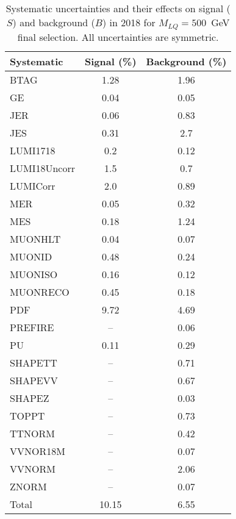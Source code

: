 \begin{table}[htbp]
\begin{center}
\caption{Systematic uncertainties and their effects on signal ($S$) and background ($B$) in 2018 for $M_{LQ}=500$~GeV final selection. All uncertainties are symmetric.}
\begin{tabular}{lcc}
\hline\hline
Systematic & Signal (\%) & Background (\%) \\ \hline 
BTAG & 1.28 & 1.96\\ 
GE & 0.04 & 0.05\\ 
JER & 0.06 & 0.83\\ 
JES & 0.31 & 2.7\\ 
LUMI1718 & 0.2 & 0.12\\ 
LUMI18Uncorr & 1.5 & 0.7\\ 
LUMICorr & 2.0 & 0.89\\ 
MER & 0.05 & 0.32\\ 
MES & 0.18 & 1.24\\ 
MUONHLT & 0.04 & 0.07\\ 
MUONID & 0.48 & 0.24\\ 
MUONISO & 0.16 & 0.12\\ 
MUONRECO & 0.45 & 0.18\\ 
PDF & 9.72 & 4.69\\ 
PREFIRE & -- & 0.06\\ 
PU & 0.11 & 0.29\\ 
SHAPETT & -- & 0.71\\ 
SHAPEVV & -- & 0.67\\ 
SHAPEZ & -- & 0.03\\ 
TOPPT & -- & 0.73\\ 
TTNORM & -- & 0.42\\ 
VVNOR18M & -- & 0.07\\ 
VVNORM & -- & 2.06\\ 
ZNORM & -- & 0.07\\ 
Total & 10.15 & 6.55\\ \hline \hline
\end{tabular}
\label{tab:SysUncertainties_uujj_500}
\end{center}
\end{table}


